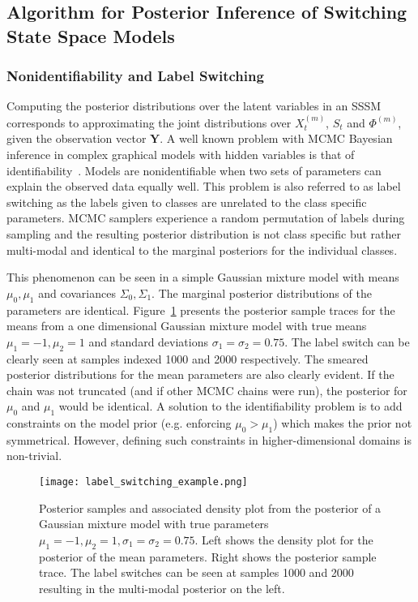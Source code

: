 \subsection{Algorithm for Posterior Inference of Switching State Space Models}\label{sec:posterior_inference_sssm}

\subsubsection{Nonidentifiability and Label Switching}
Computing the posterior distributions over the latent variables in an SSSM corresponds to approximating the joint distributions over $X_t^{(m)}$, $S_t$ and $\Phi^{(m)}$, given the observation vector $\mathbf{Y}$. A well known problem with MCMC Bayesian inference in complex graphical models with hidden variables is that of identifiability~\citep{jasra2005markov}. Models are nonidentifiable when two sets of parameters can explain the observed data equally well. This problem is also referred to as label switching as the labels given to classes are unrelated to the class specific parameters. MCMC samplers experience a random permutation of labels during sampling and the resulting posterior distribution is not class specific but rather multi-modal and identical to the marginal posteriors for the individual classes.

This phenomenon can be seen in a simple Gaussian mixture model with means $\mu_0, \mu_1$ and covariances $\Sigma_0, \Sigma_1$. The marginal posterior distributions of the parameters are identical. Figure~\ref{fig:label_switching_example} presents the posterior sample traces for the means from a one dimensional Gaussian mixture model with true means $\mu_1 = -1, \mu_2=1$ and standard deviations $\sigma_1=\sigma_2=0.75$. The label switch can be clearly seen at samples indexed 1000 and 2000 respectively. The smeared posterior distributions for the mean parameters are also clearly evident. If the chain was not truncated (and if other MCMC chains were run), the posterior for $\mu_0$ and $\mu_1$ would be identical. A solution to the identifiability problem is to add constraints on the model prior (e.g. enforcing $\mu_0 > \mu_1$) which makes the prior not symmetrical. However, defining such constraints in higher-dimensional domains is non-trivial.

\begin{figure}
  \centering
  \texttt{[image: label\_switching\_example.png]}
  \caption{Posterior samples and associated density plot from the posterior of a Gaussian mixture model with true parameters $\mu_1 = -1, \mu_2=1, \sigma_1=\sigma_2=0.75$. Left shows the density plot for the posterior of the mean parameters. Right shows the posterior sample trace. The label switches can be seen at samples 1000 and 2000 resulting in the multi-modal posterior on the left.}
  \label{fig:label_switching_example}
\end{figure}

